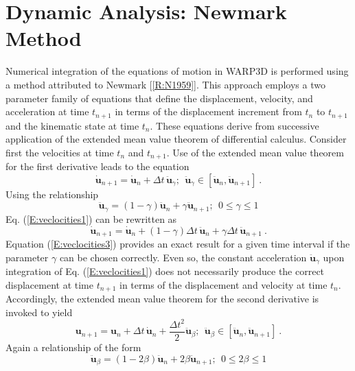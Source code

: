 \documentclass[11pt]{report}
\numberwithin{equation}{section}
\begin{document}
\section{Dynamic Analysis: Newmark \bm{$\beta$} Method}
\noindent 
Numerical integration of the equations of motion in WARP3D is performed 
using a method attributed to Newmark [\ref{R:N1959}]. This approach employs a two 
parameter family of equations that define the displacement, velocity, and acceleration 
at time $t_{n+1}$ in terms of the displacement increment from $t_n$ to $t_{n+1}$ 
and the kinematic 
state at time $t_n$. These equations derive from successive application of the extended 
mean value theorem of differential calculus. Consider first the velocities at time $t_n$ 
and $t_{n+1}$. Use of the extended mean value theorem for the first derivative leads 
to the equation 
%
\begin{equation}\label{E:veclocities1}
\dot {\bm{u}}_{n+1} = \dot {\bm{u}}_n + \Delta t\, \ddot{\bm{u}}_\gamma; ~~
\ddot{\bm{u}}_\gamma  \in \left [ \ddot{\bm{u}}_n , \ddot{\bm{u}}_{n+1} \right ]\ .
\end{equation}
%
\noindent Using the relationship
%
\begin{equation}\label{E:veclocities2}
\ddot{\bm{u}}_\gamma = \left (1-\gamma\right ) \ddot{\bm{u}}_n + 
\gamma \ddot{\bm{u}}_{n+1};~~ 0 \le \gamma \le 1
\end{equation}
%
\noindent Eq. (\ref{E:veclocities1}) can be rewritten as
%
\begin{equation}\label{E:veclocities3}
\dot{\bm{u}}_{n+1} = \dot{\bm{u}}_n + \left (1-\gamma\right ) \Delta t \,\ddot{\bm{u}}_n + 
\gamma \Delta t\, \ddot{\bm{u}}_{n+1}\ .
\end{equation}
%
\noindent Equation (\ref{E:veclocities3}) provides an exact result for a given time interval 
if the parameter $\gamma$ can be chosen correctly. Even so, the constant acceleration 
$\ddot{\bm{u}}_\gamma$ upon integration of Eq. (\ref{E:veclocities1}) does not necessarily produce the 
correct displacement at time $t_{n+1}$ in terms of the displacement and velocity at 
time $t_n$. Accordingly, the extended mean value theorem for the second derivative is invoked to yield 
%
\begin{equation}\label{E:displ1}
\bm{u}_{n+1} =\bm{u}_n + \Delta t \, \dot{\bm{u}}_n + \frac{\Delta t^2}{2}\ddot{\bm{u}}_\beta;
~~
\ddot{\bm{u}}_\beta  \in \left [ \ddot{\bm{u}}_n , \ddot{\bm{u}}_{n+1} \right ]\ .
\end{equation}
%
\noindent Again a relationship of the form
%
\begin{equation}\label{E:displ2}
\ddot{\bm{u}}_\beta = \left (1-2 \beta \right ) \ddot{\bm{u}}_n + 
2 \beta \ddot{\bm{u}}_{n+1};~~ 0 \le 2\beta \le 1
\end{equation}
\end{document}
